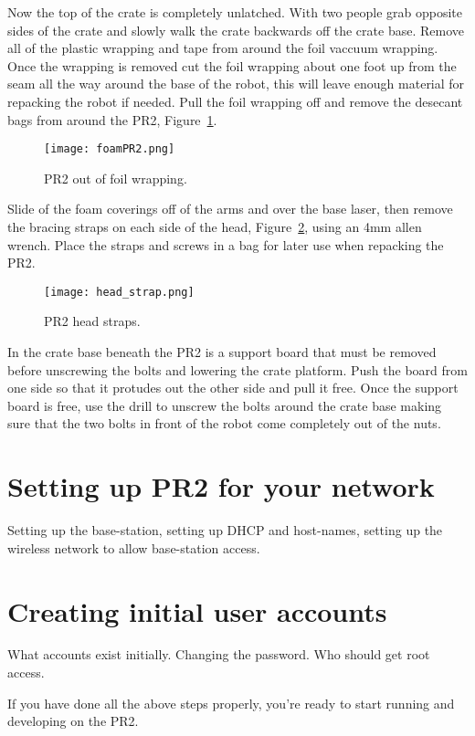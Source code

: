 Now the top of the crate is completely unlatched. With two people grab opposite
sides of the crate and slowly walk the crate backwards off the crate
base. Remove all of the plastic wrapping and tape from around the foil vaccuum
wrapping. Once the wrapping is removed cut the foil wrapping about one foot up
from the seam all the way around the base of the robot, this will leave enough
material for repacking the robot if needed. Pull the foil wrapping off and
remove the desecant bags from around the PR2, Figure~\ref{fig:foamPR2}.

\begin{figure}[h]
\centering
\texttt{[image: foamPR2.png]}
\caption{PR2 out of foil wrapping.}
\label{fig:foamPR2}
\end{figure}

Slide of the foam coverings off of the arms and over the base laser, then remove
the bracing straps on each side of the head, Figure~\ref{fig:head_straps}, using
an 4mm allen wrench. Place the straps and screws in a bag for later use when
repacking the PR2.

\begin{figure}[h]
\centering
\texttt{[image: head\_strap.png]}
\caption{PR2 head straps.}
\label{fig:head_straps}
\end{figure}

In the crate base beneath the PR2 is a support board that must be removed before
unscrewing the bolts and lowering the crate platform. Push the board from one
side so that it protudes out the other side and pull it free. Once the support
board is free, use the drill to unscrew the bolts around the crate base making
sure that the two bolts in front of the robot come completely out of the nuts.




\section{Setting up PR2 for your network}
Setting up the base-station, setting up DHCP and host-names, setting up the wireless network to allow base-station access.
\section{Creating initial user accounts}
What accounts exist initially.  Changing the password.  Who should get root access.

If you have done all the above steps properly, you're ready to start running and developing on the PR2.

